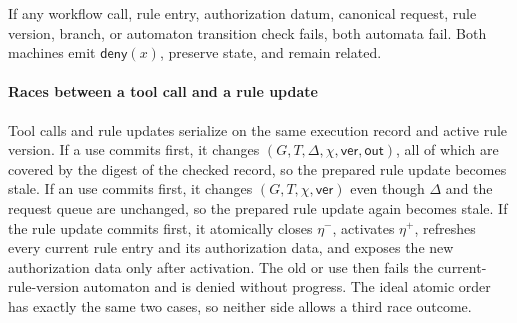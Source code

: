 If any workflow call, rule entry, authorization datum, canonical request, rule version, branch, or automaton transition check fails, both automata fail.
Both machines emit \(\mathsf{deny}(x)\), preserve state, and remain related.

\paragraph{Races between a tool call and a rule update}
Tool calls and rule updates serialize on the same execution record and active rule version.
If a \Fresh use commits first, it changes \((G,T,\Delta,\chi,\mathsf{ver},\mathsf{out})\), all of which are covered by the digest of the checked record, so the prepared rule update becomes stale.
If an \Alias use commits first, it changes \((G,T,\chi,\mathsf{ver})\) even though \(\Delta\) and the request queue are unchanged, so the prepared rule update again becomes stale.
If the rule update commits first, it atomically closes \(\eta^-\), activates \(\eta^+\), refreshes every current rule entry and its authorization data, and exposes the new authorization data only after activation.
The old \Fresh or \Alias use then fails the current-rule-version automaton and is denied without progress.
The ideal atomic order has exactly the same two cases, so neither side allows a third race outcome.

